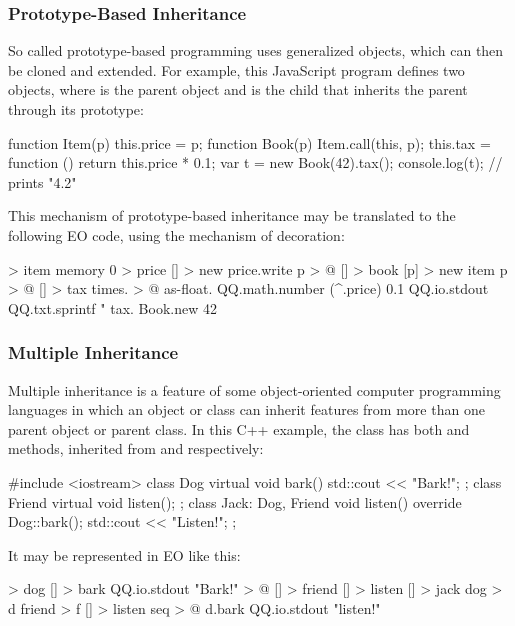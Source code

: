 \documentclass[sigplan,11pt,nonacm,natbib=false]{acmart}
\begin{document}
\subsubsection{Prototype-Based Inheritance}

So called pro\-to\-type-based programming uses generalized objects, which can then be cloned and extended. For example, this JavaScript program defines two objects, where  is the parent object and  is the child that inherits the parent through its prototype:

\begin{ffcode}
function Item(p) { this.price = p; }
function Book(p) { 
  Item.call(this, p);
  this.tax = function () {
    return this.price * 0.1;
  }
}
var t = new Book(42).tax();
console.log(t); // prints "4.2"
\end{ffcode}

This mechanism of prototype-based inheritance may be translated to the following EO code, using the mechanism of decoration:

\begin{ffcode}
[p] > item
  memory 0 > price
  [] > new
    price.write p > @
[] > book
  [p] > new
    item p > @
    [] > tax
      times. > @
        as-float.
          QQ.math.number (^.price)
        0.1
QQ.io.stdout
  QQ.txt.sprintf
    "%
    tax.
      Book.new 42
\end{ffcode}

\subsubsection{Multiple Inheritance}

Multiple inheritance is a feature of some object-oriented computer programming languages in which an object or class can inherit features from more than one parent object or parent class. In this C++ example, 
the class  has both  and  methods, inherited from  and  respectively:

\begin{ffcode}
#include <iostream>
class Dog {
  virtual void bark() { 
    std::cout << "Bark!"; 
  }
};
class Friend {
  virtual void listen();
};
class Jack: Dog, Friend {
  void listen() override { 
    Dog::bark();
    std::cout << "Listen!"; 
  }
};
\end{ffcode}

It may be represented in EO like this:

\begin{ffcode}
[] > dog
  [] > bark
    QQ.io.stdout "Bark!" > @
[] > friend
  [] > listen
[] > jack
  dog > d
  friend > f
  [] > listen
    seq > @
      d.bark
      QQ.io.stdout "listen!"
\end{ffcode}
\end{document}
